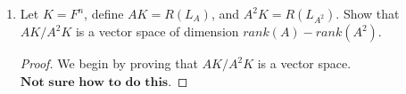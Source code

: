 \documentclass[11pt]{scrartcl}
\begin{document}
\begin{enumerate}[label=\alph*.]
{\begin{proof}
\begin{enumerate}[label=\roman*.]
{\begin{align*}
				              & = (\alpha_1u_1 + \alpha_2u_2 + \cdots + \alpha_ju_j + \alpha_{j+1}u_{j+1} + \alpha_{j+2}u_{j+2} + \cdots + \alpha_{k}u_{k}) + W      \\
				              & =  ((\alpha_1u_1 + \alpha_2u_2 + \cdots + \alpha_ju_j) + (\alpha_{j+1}u_{j+1} + \alpha_{j+2}u_{j+2} + \cdots + \alpha_{k}u_{k})) + W \\
				              & = (\alpha_{j+1}u_{j+1} + \alpha_{j+2}u_{j+2} + \cdots + \alpha_{k}u_{k}) + W                                                         \\
				              & = \alpha_{j+1}(u_{j+1} + W) + \alpha_{j+2}(u_{j+2} + W) + \cdots + \alpha_{k}(u_{k} + W)
			            \end{align*}
			            }
			            Since $\alpha_1u_1 + \alpha_2u_2 + \cdots + \alpha_ju_j \in W$, it can be removed
			            because of $\mathrm{W}$ (the fourth line). So, $\beta_{V/W}$ generates $\mathrm{V}/\mathrm{W}$.
		      \end{enumerate}
		      By definition, $\beta_{V/W}$ is a basis for $\mathrm{V}/\mathrm{W}$.
		      Therefore,
		      \begin{align*}
			      dim(\mathrm{V}/\mathrm{W}) & =  k - j                            \\
			                                 & = dim(\mathrm{V}) - dim(\mathrm{W})
		      \end{align*}
	      \end{proof}
	      }

	\item{
	      Let $K = F^n$, define $AK = R(L_A)$, and $A^2K = R(L_{A^2})$.
	      Show that $AK/A^2K$ is a vector space of dimension $rank(A) - rank(A^2)$.
	      \begin{proof}
		      We begin by proving that $AK/A^2K$ is a vector space.\\
		      $\textbf{Not sure how to do this.}$


\end{proof}}
\end{enumerate}
\end{document}
